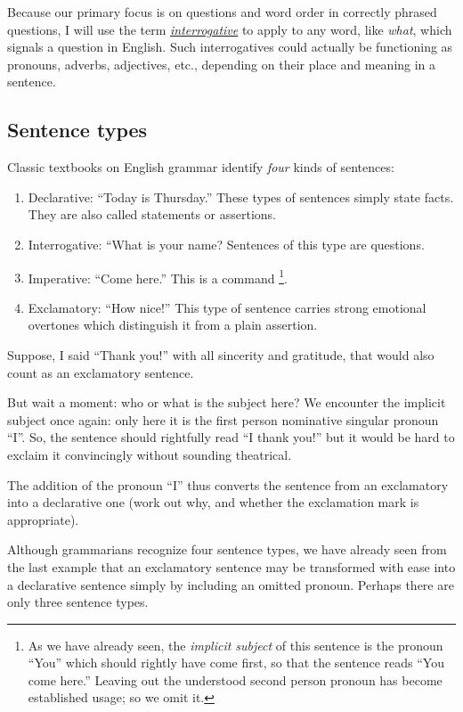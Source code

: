 \documentclass[
  a4paper,
]{article}
\begin{document}
Because our primary focus is on questions and word order in correctly
phrased questions, I will use the term
\href{https://en.wikipedia.org/wiki/Interrogative_word}{\emph{interrogative}}
to apply to any word, like \emph{what}, which signals a question in
English. Such interrogatives could actually be functioning as pronouns,
adverbs, adjectives, etc., depending on their place and meaning in a
sentence.

\hypertarget{sentence-types}{%
\subsection{Sentence types}\label{sentence-types}}

Classic textbooks on English grammar identify \emph{four} kinds of
sentences:

\begin{enumerate}
\item
  Declarative: ``Today is Thursday.'' These types of sentences simply
  state facts. They are also called statements or assertions.
\item
  Interrogative: ``What is your name? Sentences of this type are
  questions.
\item
  Imperative: ``Come here.'' This is a command \footnote{ As we have
    already seen, the \emph{implicit subject} of this sentence is the
    pronoun ``You'' which should rightly have come first, so that the
    sentence reads ``You come here.'' Leaving out the understood second
    person pronoun has become established usage; so we omit it.}.
\item
  Exclamatory: ``How nice!'' This type of sentence carries strong
  emotional overtones which distinguish it from a plain assertion.
\end{enumerate}

Suppose, I said ``Thank you!'' with all sincerity and gratitude, that
would also count as an exclamatory sentence.

But wait a moment: who or what is the subject here? We encounter the
implicit subject once again: only here it is the first person nominative
singular pronoun ``I''. So, the sentence should rightfully read ``I
thank you!'' but it would be hard to exclaim it convincingly without
sounding theatrical.

The addition of the pronoun ``I'' thus converts the sentence from an
exclamatory into a declarative one (work out why, and whether the
exclamation mark is appropriate).

Although grammarians recognize four sentence types, we have already seen
from the last example that an exclamatory sentence may be transformed
with ease into a declarative sentence simply by including an omitted
pronoun. Perhaps there are only three sentence types.
\end{document}
